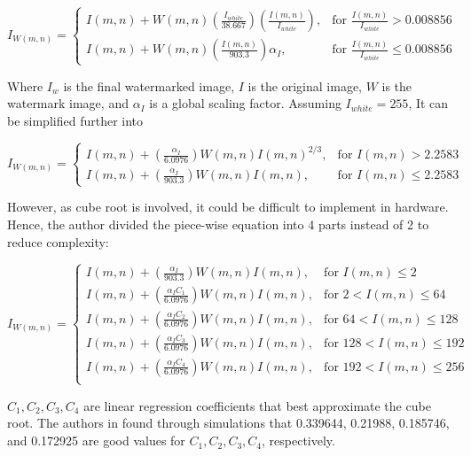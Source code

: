 \documentclass[letterpaper, 11pt]{article}
\begin{document}
	\begin{equation}
		I_{W(m,n)}=\begin{cases}
			I(m,n) + W(m,n)(\frac{I_{white}}{38.667})(\frac{I(m,n)}{I_{white}}), & \text{for } \frac{I(m,n)}{I_{white}} > 0.008856\\
			I(m,n) + W(m,n)(\frac{I(m,n)}{903.3})\alpha_I, & \text{for } \frac{I(m,n)}{I_{white}} \leq 0.008856
		\end{cases}
	\end{equation}
	
	Where $I_w$ is the final watermarked image, $I$ is the original image, $W$ is the watermark image, and $\alpha_I$ is a global scaling factor. Assuming $I_{white}=255$, It can be simplified further into
	
	\begin{equation}
		I_{W(m,n)}=\begin{cases}
			I(m,n) + (\frac{\alpha_I}{6.0976})W(m,n)I(m,n)^{2/3}, & \text{for } I(m,n) > 2.2583\\
			I(m,n) + (\frac{\alpha_I}{903.3})W(m,n)I(m,n), & \text{for } I(m,n) \leq 2.2583
		\end{cases}
	\end{equation}
	
	However, as cube root is involved, it could be difficult to implement in hardware. Hence, the author divided the piece-wise equation into 4 parts instead of 2 to reduce complexity:
	
	\begin{equation}
		\label{eq3}
		I_{W(m,n)}=\begin{cases}
			I(m,n) + (\frac{\alpha_I}{903.3})W(m,n)I(m,n), & \text{for } I(m,n) \leq 2 \\
			I(m,n) + (\frac{\alpha_I C_1}{6.0976})W(m,n)I(m,n), & \text{for } 2 < I(m,n) \leq 64 \\
			I(m,n) + (\frac{\alpha_I C_2}{6.0976})W(m,n)I(m,n), & \text{for } 64 < I(m,n) \leq 128 \\
			I(m,n) + (\frac{\alpha_I C_3}{6.0976})W(m,n)I(m,n), & \text{for } 128 < I(m,n) \leq 192 \\
			I(m,n) + (\frac{\alpha_I C_4}{6.0976})W(m,n)I(m,n), & \text{for } 192 < I(m,n) \leq 256 \\
		\end{cases}
	\end{equation}
	
	$C_1, C_2, C_3, C_4$ are linear regression coefficients that best approximate the cube root. The authors in \cite{1} found through simulations that 0.339644, 0.21988, 0.185746, and 0.172925 are good values for $C_1, C_2, C_3, C_4$, respectively.
	
\end{document}
